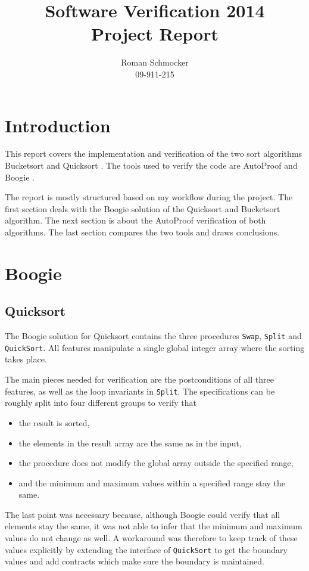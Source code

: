 \documentclass[a4paper,10pt]{article}
\title{Software Verification 2014 \\ Project Report \vspace{-2ex}}
\author{Roman Schmocker \\ 09-911-215 \vspace{-2ex}}
\begin{document}
\setlength{\droptitle}{-80pt}
\maketitle


\section{Introduction}
This report covers the implementation and verification of the two sort algorithms Bucketsort \cite{web:bucketsort} and Quicksort \cite{web:quicksort}.
The tools used to verify the code are AutoProof \cite{web:autoproof} and Boogie \cite{paper:boogie, web:boogie}.

The report is mostly structured based on my workflow during the project.
The first section deals with the Boogie solution of the Quicksort and Bucketsort algorithm.
The next section is about the AutoProof verification of both algorithms.
The last section compares the two tools and draws conclusions.

\section {Boogie}

\subsection {Quicksort}

The Boogie solution for Quicksort contains the three procedures \lstinline!Swap!, \lstinline!Split! and \lstinline!QuickSort!.
All features manipulate a single global integer array where the sorting takes place.

The main pieces needed for verification are the postconditions of all three features, as well as the loop invariants in \lstinline!Split!.
The specifications can be roughly split into four different groups to verify that
\begin{itemize}
 \item the result is sorted, 
 \item the elements in the result array are the same as in the input,
 \item the procedure does not modify the global array outside the specified range,
 \item and the minimum and maximum values within a specified range stay the same.
\end{itemize}

The last point was necessary because, although Boogie could verify that all elements stay the same,
it was not able to infer that the minimum and maximum values do not change as well.
A workaround was therefore to keep track of these values explicitly by extending the interface of \lstinline!QuickSort! to get the boundary values
and add contracts which make sure the boundary is maintained.
\end{document}
